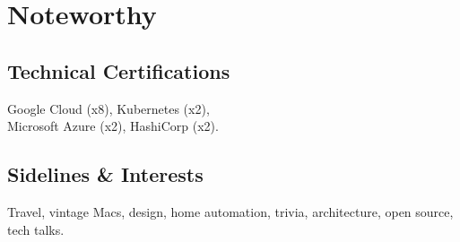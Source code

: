 \documentclass[]{cvpn}
\begin{document}
\begin{multicols}{2}
\begin{eventlist}
\end{eventlist}

\section{Noteworthy}

\subsection{Technical Certifications}
Google Cloud (x8), Kubernetes (x2),\\Microsoft Azure (x2), HashiCorp (x2).
\\




\subsection{Sidelines \& Interests}
Travel, vintage Macs, design, home automation,
trivia, architecture, open source, tech talks.


\end{multicols}
\end{document}
